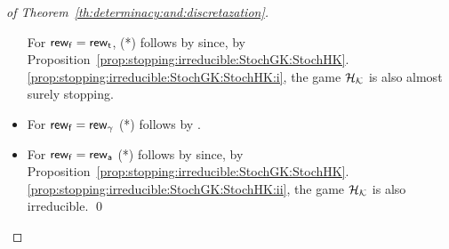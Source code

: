 \begin{proof}[of Theorem~\ref{th:determinacy:and:discretazation}]
\begin{itemize}
    For $\mathsf{rew}_{\mathsf{f}}=\mathsf{rew}_{\mathsf{t}}$, (*) follows by
    \cite[Theorem~4.2.6]{FilarV96} since, by
    Proposition~\ref{prop:stopping:irreducible:StochGK:StochHK}.\ref{prop:stopping:irreducible:StochGK:StochHK:i},
    the game ${\mathcal{H}_{\mathcal{K}}}$ is also almost surely stopping.
  \item%
    For $\mathsf{rew}_{\mathsf{f}}=\mathsf{rew}_{\gamma}$ (*) follows by
    \cite[Theorem~4.3.2]{FilarV96}.
  \item%
    For $\mathsf{rew}_{\mathsf{f}}=\mathsf{rew}_{\mathsf{a}}$ (*) follows by
    \cite[Theorem~5.1.5]{FilarV96} since, by
    Proposition~\ref{prop:stopping:irreducible:StochGK:StochHK}.\ref{prop:stopping:irreducible:StochGK:StochHK:ii},
    the game ${\mathcal{H}_{\mathcal{K}}}$ is also irreducible.
  \qed
  \end{itemize}
\end{proof}
